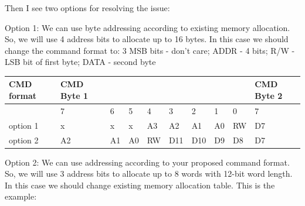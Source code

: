 Then I see two options for resolving the issue:

Option 1:
We can use byte addressing according to existing memory allocation. So, we will use 4 address bits to allocate up to 16 bytes.
In this case we should change the command format to: 3 MSB bits - don't care; ADDR - 4 bits; R/W - LSB bit of first byte; DATA - second byte 

\begin{table}[!ht]
    \centering
    \begin{tabular}{|l|l|l|l|l|l|l|l|l|l|}
    \hline
    \rowcolor{LightCyan}
        CMD format & CMD Byte 1 & ~ & ~ & ~ & ~ & ~ & ~ & ~ & CMD Byte 2 \\ \hline
        ~ & 7 & 6 & 5 & 4 & 3 & 2 & 1 & 0 & 7 \\ \hline
        option 1 & x & x & x & A3 & A2 & A1 & A0 & RW & D7 \\ \hline
        option 2 & A2 & A1 & A0 & RW & D11 & D10 & D9 & D8 & D7 \\ \hline
    \end{tabular}
\end{table}


Option 2:
We can use addressing according to your proposed command format. So, we will use 3 address bits to allocate up to 8 words with 12-bit word length.
In this case we should change existing memory allocation table. This is the example:


